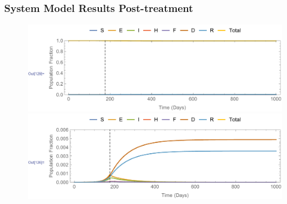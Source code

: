 \documentclass[30pt]{beamer}
\begin{document}
\begin{frame}
\frametitle{System Model Results Post-treatment}
\begin{figure}[h!]
 \centering 
  \includegraphics[width=\textwidth]{SEIPlotInt.pdf}  \label{fig:LB_IM_In1} %
  \hspace{.1cm}
 \includegraphics[width=\textwidth]{SEIPlotIntRescale.pdf}  \label{fig:LB_IM_In2} %
\label{fig:LB_IM_In} 
\end{figure}
\end{frame}
\end{document}
